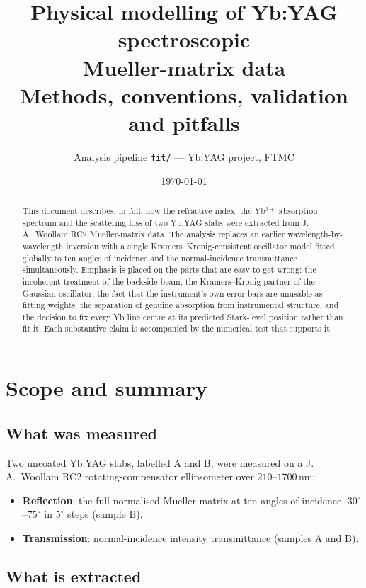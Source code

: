 \documentclass[11pt,a4paper]{article}
\title{\bf Physical modelling of Yb:YAG spectroscopic\\ Mueller-matrix data\\[0.4em]
\large Methods, conventions, validation and pitfalls}
\author{Analysis pipeline \texttt{fit/} --- Yb:YAG project, FTMC}
\date{\today}
\begin{document}
\maketitle

\begin{abstract}
\noindent
This document describes, in full, how the refractive index, the Yb$^{3+}$
absorption spectrum and the scattering loss of two Yb:YAG slabs were extracted
from J.\,A.~Woollam RC2 Mueller-matrix data. The analysis replaces an earlier
wavelength-by-wavelength inversion with a single Kramers--Kronig-consistent
oscillator model fitted globally to ten angles of incidence and the
normal-incidence transmittance simultaneously. Emphasis is placed on the parts
that are easy to get wrong: the incoherent treatment of the backside beam, the
Kramers--Kronig partner of the Gaussian oscillator, the fact that the
instrument's own error bars are unusable as fitting weights, the separation of
genuine absorption from instrumental structure, and the decision to fix every
Yb line centre at its predicted Stark-level position rather than fit it. Each
substantive claim is accompanied by the numerical test that supports it.
\end{abstract}

\tableofcontents

\section{Scope and summary}

\subsection{What was measured}

Two uncoated Yb:YAG slabs, labelled A and B, were measured on a J.\,A.~Woollam
RC2 rotating-compensator ellipsometer over $210$--$1700$\,nm:

\begin{itemize}
\item \textbf{Reflection}: the full normalised Mueller matrix at ten angles of
      incidence, $30^\circ$--$75^\circ$ in $5^\circ$ steps (sample B).
\item \textbf{Transmission}: normal-incidence intensity transmittance
      (samples A and B).
\end{itemize}

\subsection{What is extracted}
\end{document}
